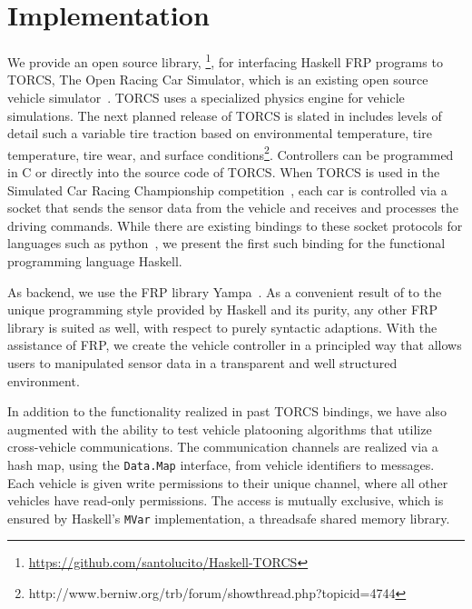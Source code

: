 \section{Implementation}

We provide an open source library, \ourLib\footnote{\url{https://github.com/santolucito/Haskell-TORCS}}, for interfacing Haskell FRP programs to TORCS, The Open Racing Car Simulator, which is an existing open source vehicle simulator~\cite{torcs}.
TORCS uses a specialized physics engine for vehicle simulations. 
The next planned release of TORCS is slated in includes levels of detail such a variable tire traction based on environmental temperature, tire temperature, tire wear, and surface conditions\footnote{http://www.berniw.org/trb/forum/showthread.php?topicid=4744}.
Controllers can be programmed in C or \CC directly into the source code of TORCS.
When TORCS is used in the Simulated Car Racing Championship competition~\cite{SCRC}, each car is controlled via a socket that sends the sensor data from the vehicle and receives and processes the driving commands.
While there are existing bindings to these socket protocols for languages such as python~\cite{snakeoil,pyscrc}, we present the first such binding for the functional programming language Haskell.

As backend, we use the FRP library Yampa~\cite{courtney2003yampa}. 
As a convenient result of to the unique programming style provided by Haskell and its purity, any other FRP library is suited as well, with respect to purely syntactic adaptions.
With the assistance of FRP, we create the  vehicle controller in a principled way that allows users to manipulated sensor data in a transparent and well structured environment.



In addition to the functionality realized in past TORCS bindings, we have also augmented \ourLib with the ability to test vehicle platooning algorithms that utilize cross-vehicle communications.
The communication channels are realized via a hash map, using the \texttt{Data.Map} interface, from vehicle identifiers to messages.
Each vehicle is given write permissions to their unique channel, where all other vehicles have read-only permissions.
The access is mutually exclusive, which is ensured by Haskell's \texttt{MVar} implementation, a threadsafe shared memory library. %
